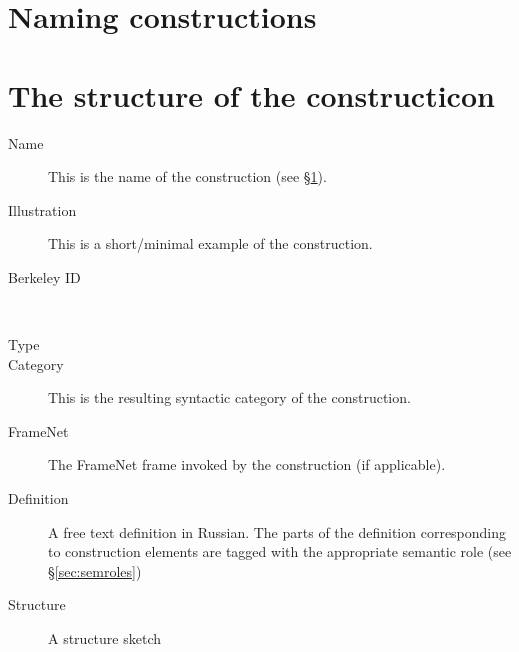 \documentclass[a4paper,11pt, onecolumn,twoside]{article}
\begin{document}
\section{Naming constructions}
\label{sec:name}


\section{The structure of the constructicon}

\begin{description}
  \item[Name] This is the name of the construction (see §\ref{sec:name}).
  \item[Illustration] This is a short/minimal example of the construction.
  \item[Berkeley ID] ~
  \item[Type]
  \item[Category] This is the resulting syntactic category of the construction.
  \item[FrameNet] The FrameNet frame invoked by the construction (if applicable).
  \item[Definition] A free text definition in Russian. The parts of the definition 
      corresponding to construction elements are tagged with the appropriate semantic role (see §\ref{sec:semroles})
  \item[Structure] A structure sketch
\end{description}



% 
\end{document}
